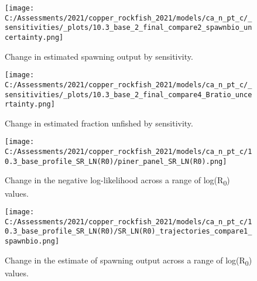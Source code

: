 \documentclass[11pt,
  english,
  a4paper,
]{article}
\begin{document}
\tagmcend\tagstructend


\begin{figure}
\centering
\texttt{[image: C:/Assessments/2021/copper\_rockfish\_2021/models/ca\_n\_pt\_c/\_sensitivities/\_plots/10.3\_base\_2\_final\_compare2\_spawnbio\_uncertainty.png]}
\caption{Change in estimated spawning output by sensitivity.\label{fig:sens-ssb-2}}
\end{figure}

\tagmcend\tagstructend


\begin{figure}
\centering
\texttt{[image: C:/Assessments/2021/copper\_rockfish\_2021/models/ca\_n\_pt\_c/\_sensitivities/\_plots/10.3\_base\_2\_final\_compare4\_Bratio\_uncertainty.png]}
\caption{Change in estimated fraction unfished by sensitivity.\label{fig:sens-depl-2}}
\end{figure}

\tagmcend\tagstructend


\begin{figure}
\centering
\texttt{[image: C:/Assessments/2021/copper\_rockfish\_2021/models/ca\_n\_pt\_c/10.3\_base\_profile\_SR\_LN(R0)/piner\_panel\_SR\_LN(R0).png]}
\caption{Change in the negative log-likelihood across a range of log(R\textsubscript{0}) values.\label{fig:r0-profile}}
\end{figure}

\tagmcend\tagstructend


\begin{figure}
\centering
\texttt{[image: C:/Assessments/2021/copper\_rockfish\_2021/models/ca\_n\_pt\_c/10.3\_base\_profile\_SR\_LN(R0)/SR\_LN(R0)\_trajectories\_compare1\_spawnbio.png]}
\caption{Change in the estimate of spawning output across a range of log(R\textsubscript{0}) values.\label{fig:r0-ssb}}
\end{figure}

\tagmcend\tagstructend

\end{document}
